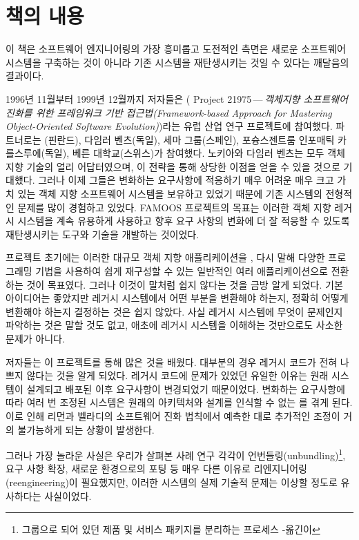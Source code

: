 \documentclass[a4paper,10pt,twoside]{book}
\begin{document}
\section*{책의 내용}

이 책은 소프트웨어 엔지니어링의 가장 흥미롭고 도전적인 측면은 새로운 소프트웨어 시스템을 구축하는 것이 아니라 기존 시스템을 재탄생시키는 것일 수 있다는 깨달음의 결과이다.

1996년 11월부터 1999년 12월까지 저자들은 ( Project 21975\,---\,\emph{객체지향 소프트웨어 진화를 위한 프레임워크 기반 접근법(Framework-based Approach for Mastering Object-Oriented Software Evolution)})라는 유럽 산업 연구 프로젝트에 참여했다. 파트너로는 (핀란드), 다임러 벤츠(독일), 세마 그룹(스페인), 포슝스젠트룸 인포매틱 카를스루에(독일), 베른 대학교(스위스)가 참여했다. 노키아와 다임러 벤츠는 모두 객체 지향 기술의 얼리 어답터였으며, 이 전략을 통해 상당한 이점을 얻을 수 있을 것으로 기대했다. 그러나 이제 그들은 변화하는 요구사항에 적응하기 매우 어려운 매우 크고 가치 있는 객체 지향 소프트웨어 시스템을 보유하고 있었기 때문에 기존 시스템의 전형적인 문제를 많이 경험하고 있었다. FAMOOS 프로젝트의 목표는 이러한 객체 지향 레거시 시스템을 계속 유용하게 사용하고 향후 요구 사항의 변화에 더 잘 적응할 수 있도록 재탄생시키는 도구와 기술을 개발하는 것이었다.

프로젝트 초기에는 이러한 대규모 객체 지향 애플리케이션을 ,  다시 말해 다양한 프로그래밍 기법을 사용하여 쉽게 재구성할 수 있는 일반적인 여러 애플리케이션으로 전환하는 것이 목표였다. 그러나 이것이 말처럼 쉽지 않다는 것을 금방 알게 되었다. 기본 아이디어는 좋았지만 레거시 시스템에서 어떤 부분을 변환해야 하는지, 정확히 어떻게 변환해야 하는지 결정하는 것은 쉽지 않았다. 사실 레거시 시스템에 무엇이 문제인지 파악하는 것은 말할 것도 없고, 애초에 레거시 시스템을 이해하는 것만으로도 사소한 문제가 아니다.

저자들는 이 프로젝트를 통해 많은 것을 배웠다. 대부분의 경우 레거시 코드가 전혀 나쁘지 않다는 것을 알게 되었다. 레거시 코드에 문제가 있었던 유일한 이유는 원래 시스템이 설계되고 배포된 이후 요구사항이 변경되었기 때문이었다. 변화하는 요구사항에 따라 여러 번 조정된 시스템은 원래의 아키텍처와 설계를 인식할 수 없는 를 겪게 된다. 이로 인해 리먼과 벨라디의 소프트웨어 진화 법칙에서 예측한 대로 추가적인 조정이 거의 불가능하게 되는 상황이 발생한다.

그러나 가장 놀라운 사실은 우리가 살펴본 사례 연구 각각이 언번들링(unbundling)\footnote{그룹으로 되어 있던 제품 및 서비스 패키지를 분리하는 프로세스 -옮긴이}, 요구 사항 확장, 새로운 환경으로의 포팅 등 매우 다른 이유로 리엔지니어링(reengineering)이 필요했지만, 이러한 시스템의 실제 기술적 문제는 이상할 정도로 유사하다는 사실이었다. 
\end{document}
